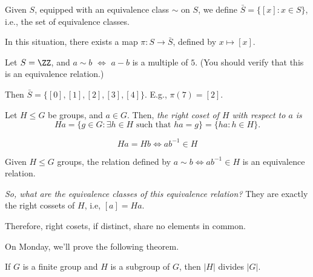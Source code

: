 Given $S$, equipped with an equivalence class $\sim$ on  $S$, we define $\bar{S} = \{[x] : x \in S\}$, i.e., the set of equivalence classes.

In this situation, there exists a map  $\pi: S \to \bar S$, defined by $x \mapsto [x]$.
 
\begin{exmp}
	Let $S = \ZZ$, and $a \sim b$ $\iff$ $a - b$ is a multiple of  $5$. (You should verify that this is an equivalence relation.)

	Then $\bar S = \{[0], [1], [2], [3], [4]\}$. E.g., $\pi(7)  = [2]$.
\end{exmp}

\begin{defn}
	Let $H \le G$ be groups, and $a \in G$. Then, \emph{the right coset of $H$ with respect to $a$ is} 
	\[Ha = \{ g \in G : \exists h \in H \text{ such that } ha = g\} = \{ha : h \in H\}.\]
\end{defn}

\begin{lem}
	\[Ha = Hb \iff ab^{-1} \in H\]
\end{lem}

\begin{lem}
	Given $H \le G$ groups, the relation defined by $a \sim b \iff ab^{-1} \in H$ is an equivalence relation.
\end{lem}

\textsl{So, what are the equivalence classes of this equivalence relation?} They are exactly the right cossets of $H$, i.e, $[a] = Ha$. 

Therefore, right cosets, if distinct, share no elements in common.

On Monday, we'll prove the following theorem. 
\begin{thm}
	If $G$ is a finite group and  $H$ is a subgroup of $G$, then $|H|$ divides $|G|$.
\end{thm}
